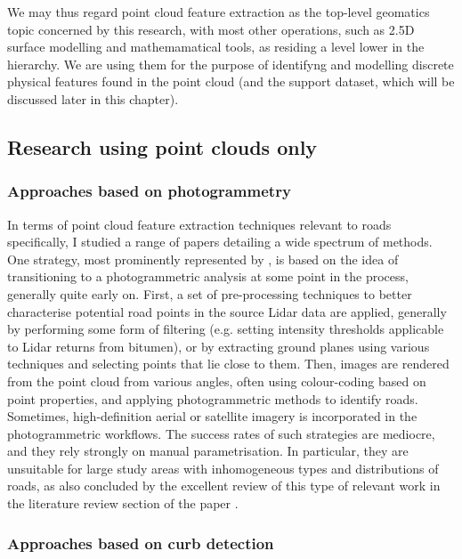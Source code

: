 We may thus regard point cloud feature extraction as the top-level geomatics topic concerned by this research, with most other operations, such as 2.5D surface modelling and mathemamatical tools, as residing a level lower in the hierarchy. We are using them for the purpose of identifyng and modelling discrete physical features found in the point cloud (and the support dataset, which will be discussed later in this chapter).

\subsection{Research using point clouds only}
\label{sub:roadidentification_pconly}

\subsubsection{Approaches based on photogrammetry}

In terms of point cloud feature extraction techniques relevant to roads specifically, I studied a range of papers detailing a wide spectrum of methods. One strategy, most prominently represented by \cite{hu_2003, hu_etal_2004, zhu_mordohai_2009, zhu_hyppa_2014, lin_etal_2015}, is based on the idea of transitioning to a photogrammetric analysis at some point in the process, generally quite early on. First, a set of pre-processing techniques to better characterise potential road points in the source Lidar data are applied, generally by performing some form of filtering (e.g. setting intensity thresholds applicable to Lidar returns from bitumen), or by extracting ground planes using various techniques and selecting points that lie close to them. Then, images are rendered from the point cloud from various angles, often using colour-coding based on point properties, and applying photogrammetric methods to identify roads. Sometimes, high-definition aerial or satellite imagery is incorporated in the photogrammetric workflows. The success rates of such strategies are mediocre, and they rely strongly on manual parametrisation. In particular, they are unsuitable for large study areas with inhomogeneous types and distributions of roads, as also concluded by the excellent review of this type of relevant work in the literature review section of the paper \cite{yang_etal_2013}.

\subsubsection{Approaches based on curb detection}

